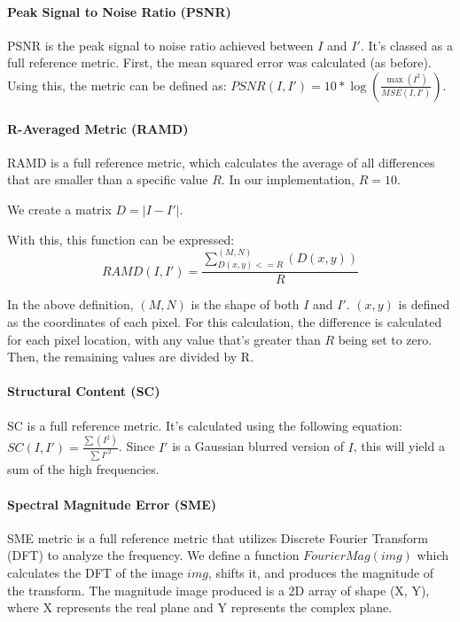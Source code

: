 \documentclass[10pt,a4paper]{article}
\begin{document}
            \paragraph{Peak Signal to Noise Ratio (PSNR)}
                PSNR is the peak signal to noise ratio achieved between $I$ and $I'$. It's classed as a full reference metric.
                First, the mean squared error was calculated (as before). Using this, the metric can be defined as:
                $PSNR(I, I') = 10 * \log(\frac{\max(I^2)}{MSE(I, I')})$. \cite{ImageQualityAssessmentTest}

            \paragraph{R-Averaged Metric (RAMD)}
                RAMD is a full reference metric, which calculates the average of all differences that are smaller than a specific value $R$.
                In our implementation, $R=10$.

                We create a matrix $D = |I - I'|$.

                With this, this function can be expressed: $$RAMD(I, I') = \frac{\sum_{D(x, y) <= R}^{(M, N)}(D(x, y))}{R}$$

                In the above definition, $(M, N)$ is the shape of both $I$ and $I'$. $(x, y)$ is defined as the coordinates of each pixel. For this calculation,
                the difference is calculated for each pixel location, with any value that's greater than $R$ being set to zero. Then, the remaining values are divided by R.

            \paragraph{Structural Content (SC)}
                SC is a full reference metric. It's calculated using the following equation: $SC(I, I') = \frac{\sum(I^2)}{\sum{I'^2}}$.
                Since $I'$ is a Gaussian blurred version of $I$, this will yield a sum of the high frequencies.

            \paragraph{Spectral Magnitude Error (SME)}
                SME metric is a full reference metric that utilizes Discrete Fourier Transform (DFT) to analyze the frequency.
                We define a function $FourierMag(img)$ which calculates the DFT of the image $img$, shifts it, and produces the magnitude of the transform. The magnitude image produced
                is a 2D array of shape (X, Y), where X represents the real plane and Y represents the complex plane.
\end{document}
